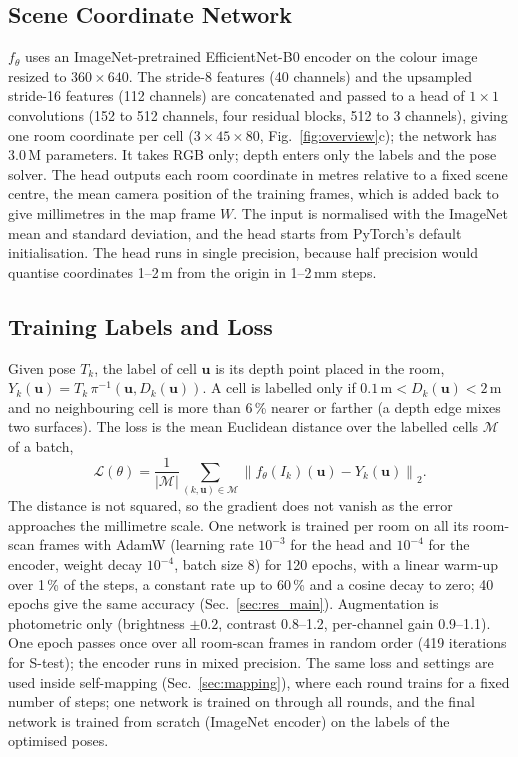 \documentclass[9pt,shortpaper,twoside,web]{ieeecolor2}
\newcommand{\Stest}{S-test}
\begin{document}
\subsection{Scene Coordinate Network}
\label{sec:network}
$f_\theta$ uses an ImageNet-pretrained EfficientNet-B0 encoder \cite{tan2019efficientnet} on the colour image resized to $360\times640$. The stride-8 features (40 channels) and the upsampled stride-16 features (112 channels) are concatenated and passed to a head of $1\times1$ convolutions (152 to 512 channels, four residual blocks, 512 to 3 channels), giving one room coordinate per cell ($3\times45\times80$, Fig.~\ref{fig:overview}c); the network has 3.0\,M parameters. It takes RGB only; depth enters only the labels and the pose solver. The head outputs each room coordinate in metres relative to a fixed scene centre, the mean camera position of the training frames, which is added back to give millimetres in the map frame $W$. The input is normalised with the ImageNet mean and standard deviation, and the head starts from PyTorch's default initialisation. The head runs in single precision, because half precision would quantise coordinates 1--2\,m from the origin in 1--2\,mm steps.


\subsection{Training Labels and Loss}
\label{sec:training}
Given pose $T_k$, the label of cell $\mathbf{u}$ is its depth point placed in the room, $Y_k(\mathbf{u})=T_k\,\pi^{-1}(\mathbf{u},D_k(\mathbf{u}))$. A cell is labelled only if $0.1\,\mathrm{m}<D_k(\mathbf{u})<2$\,m and no neighbouring cell is more than 6\,\% nearer or farther (a depth edge mixes two surfaces). The loss is the mean Euclidean distance over the labelled cells $\mathcal{M}$ of a batch,
\begin{equation}
  \mathcal{L}(\theta)=\frac{1}{|\mathcal{M}|}\sum_{(k,\mathbf{u})\in\mathcal{M}}\left\|f_\theta(I_k)(\mathbf{u})-Y_k(\mathbf{u})\right\|_2 .
  \label{eq:loss}
\end{equation}
The distance is not squared, so the gradient does not vanish as the error approaches the millimetre scale. One network is trained per room on all its room-scan frames with AdamW (learning rate $10^{-3}$ for the head and $10^{-4}$ for the encoder, weight decay $10^{-4}$, batch size 8) for 120 epochs, with a linear warm-up over 1\,\% of the steps, a constant rate up to 60\,\% and a cosine decay to zero; 40 epochs give the same accuracy (Sec.~\ref{sec:res_main}). Augmentation is photometric only (brightness $\pm0.2$, contrast 0.8--1.2, per-channel gain 0.9--1.1). One epoch passes once over all room-scan frames in random order (419 iterations for \Stest{}); the encoder runs in mixed precision. The same loss and settings are used inside self-mapping (Sec.~\ref{sec:mapping}), where each round trains for a fixed number of steps; one network is trained on through all rounds, and the final network is trained from scratch (ImageNet encoder) on the labels of the optimised poses.
\end{document}
